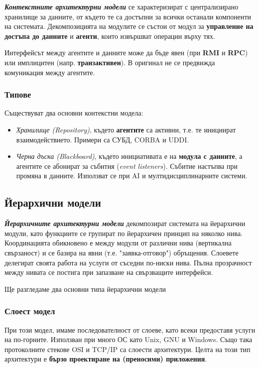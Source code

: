 \documentclass{scrartcl}
\begin{document}
\begin{FlushLeft}
\textbf{\textit{Контекстните архитектурни модели}} се характеризират с централизирано хранилище за данните, от където те са достъпни за всички останали компоненти на системата.
Декомпозицията на модулите се състои от модул за \textbf{управление на достъпа до данните} и \textbf{агенти}, които извършват операции върху тях.

Интерфейсът между агентите и данните може да бъде явен (при \textbf{RMI} и \textbf{RPC}) или имплицитен (напр. \textbf{транзактивен}).
В оригинал не се предвижда комуникация между агентите.

\subsubsection{Типове}
Съществуват два основни контекстни модела:
\begin{itemize}
    \item \textit{Хранилище (Repository)}, където \textbf{агентите} са активни, т.е. те инициират взаимодействието. Примери са СУБД, CORBA и UDDI.
    \item \textit{Черна дъска (Blackboard)}, където инициативата е на \textbf{модула с данните}, а агентите се абонират за събития (\textit{event listeners}).
    Събитие настъпва при промяна в данните.
    Използват се при AI и мултидисциплинарните системи.
\end{itemize}

\subsection{Йерархични модели}

\textbf{\textit{Йерархичните архитектурни модели}} декомпозират системата на йерархични модули, като функциите се групират по йерархичен принцип на няколко нива.
Координацията обикновено е между модули от различни нива (вертикална свързаност) и се базира на явни (т.е. "заявка-отговор") обръщения.
Слоевете делегират своята работа на услуги от съседни по-ниски нива.
Пълна прозрачност между нивата се постига при запазване на свързващите интерфейси.

Ще разгледаме два основни типа йерархични модели
\subsubsection{Слоест модел}
При този модел, имаме последователност от слоеве, като всеки предоставя услуги на по-горните.
Използван при много ОС като Unix, GNU и Windows. Също така протоколните стекове OSI и TCP/IP са слоести архитектури.
Целта на този тип архитектури е \textbf{бързо проектиране на (преносими) приложения}.


\end{FlushLeft}
\end{document}
